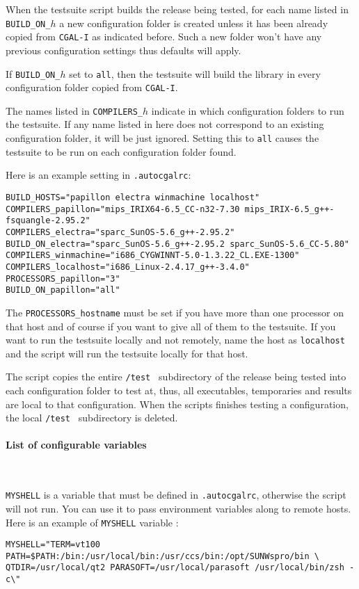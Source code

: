 When the testsuite script builds the release being tested, 
for each name listed in \texttt{BUILD\_ON\_$h$} a new configuration
folder is created unless it has been already copied from {\tt CGAL-I}
as indicated before. Such a new folder won't have any previous configuration
settings thus defaults will apply.

If \texttt{BUILD\_ON\_$h$} set to \texttt{all}, then
the testsuite will build the library in every configuration folder
copied from {\tt CGAL-I}.

The names listed in \texttt{COMPILERS\_$h$} indicate in which configuration folders
to run the testsuite. If any name listed in here does not correspond to an existing
configuration folder, it will be just ignored. Setting this to \texttt{all} causes the
testsuite to be run on each configuration folder found.

\noindent Here is an example setting in {\tt .autocgalrc}:
\begingroup\small
\begin{verbatim}
BUILD_HOSTS="papillon electra winmachine localhost"
COMPILERS_papillon="mips_IRIX64-6.5_CC-n32-7.30 mips_IRIX-6.5_g++-fsquangle-2.95.2"
COMPILERS_electra="sparc_SunOS-5.6_g++-2.95.2"
BUILD_ON_electra="sparc_SunOS-5.6_g++-2.95.2 sparc_SunOS-5.6_CC-5.80"
COMPILERS_winmachine="i686_CYGWINNT-5.0-1.3.22_CL.EXE-1300"
COMPILERS_localhost="i686_Linux-2.4.17_g++-3.4.0"
PROCESSORS_papillon="3" 
BUILD_ON_papillon="all"
\end{verbatim}\endgroup

The {\tt PROCESSORS\_hostname} must be set if you have more
than one processor on that host and of course if you want to give all
of them to the testsuite. If you want to run the testsuite locally and
not remotely, name the host as {\tt localhost} and the script will run
the testsuite locally for that host.

The script copies the entire {\tt /test } subdirectory of the release being tested
into each configuration folder to test at, thus, all executables, temporaries
and results are local to that configuration. When the scripts finishes testing 
a configuration, the local {\tt /test } subdirectory is deleted.

\paragraph{List of configurable variables} ~

{\tt MYSHELL} is a variable that must be defined in {\tt .autocgalrc},
otherwise the script will not run.  You can use it to pass environment
variables along to remote hosts.  Here is an example of {\tt MYSHELL}
variable :
\begin{verbatim}
MYSHELL="TERM=vt100 PATH=$PATH:/bin:/usr/local/bin:/usr/ccs/bin:/opt/SUNWspro/bin \
QTDIR=/usr/local/qt2 PARASOFT=/usr/local/parasoft /usr/local/bin/zsh -c\"
\end{verbatim}

